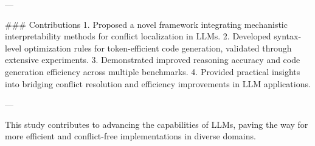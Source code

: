 ---

### Contributions  
1. Proposed a novel framework integrating mechanistic interpretability methods for conflict localization in LLMs.  
2. Developed syntax-level optimization rules for token-efficient code generation, validated through extensive experiments.  
3. Demonstrated improved reasoning accuracy and code generation efficiency across multiple benchmarks.  
4. Provided practical insights into bridging conflict resolution and efficiency improvements in LLM applications.  

--- 

This study contributes to advancing the capabilities of LLMs, paving the way for more efficient and conflict-free implementations in diverse domains.